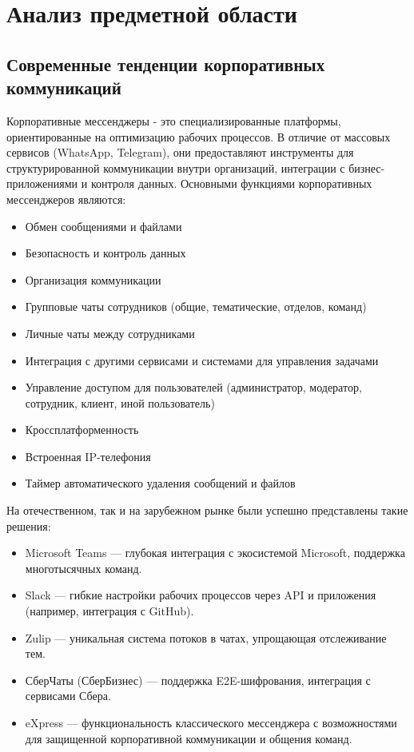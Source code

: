 \section{Анализ предметной области}
\subsection{Современные тенденции корпоративных коммуникаций}

Корпоративные мессенджеры - это специализированные платформы, ориентированные на оптимизацию рабочих процессов. В отличие от массовых сервисов (WhatsApp, Telegram), они предоставляют инструменты для структурированной коммуникации внутри организаций, интеграции с бизнес-приложениями и контроля данных.
Основными функциями корпоративных мессенджеров являются:
\begin{itemize}
	\item Обмен сообщениями и файлами
	\item Безопасность и контроль данных
	\item Организация коммуникации
	\item Групповые чаты сотрудников (общие, тематические, отделов, команд)
	\item Личные чаты между сотрудниками
	\item Интеграция с другими сервисами и системами для управления задачами
	\item Управление доступом для пользователей (администратор, модератор, сотрудник, клиент, иной пользователь)
	\item Кроссплатформенность
	\item Встроенная IP-телефония
	\item Таймер автоматического удаления сообщений и файлов
\end{itemize}

На отечественном, так и на зарубежном рынке были успешно представлены такие решения:
\begin{itemize}
	\item Microsoft Teams — глубокая интеграция с экосистемой Microsoft, поддержка многотысячных команд.
	\item Slack — гибкие настройки рабочих процессов через API и приложения (например, интеграция с GitHub).
	\item Zulip — уникальная система потоков в чатах, упрощающая отслеживание тем.
	\item СберЧаты (СберБизнес) — поддержка E2E-шифрования, интеграция с сервисами Сбера.
	\item eXpress  — функциональность классического мессенджера с возможностями для защищенной корпоративной коммуникации и общения команд. 
\end{itemize}

